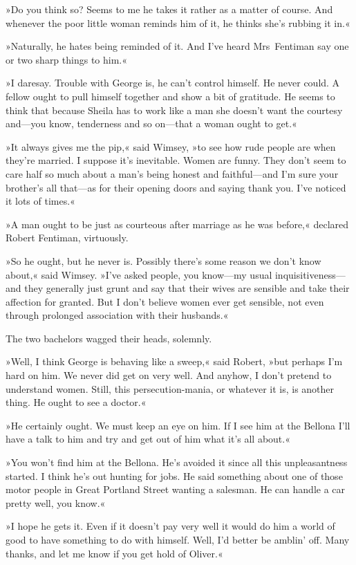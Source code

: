 »Do you think so? Seems to me he takes it rather as a matter of course. And whenever the poor little woman reminds him of it, he thinks she's rubbing it in.«

»Naturally, he hates being reminded of it. And I've heard Mrs~Fentiman say one or two sharp things to him.«

»I daresay. Trouble with George is, he can't control himself. He never could. A fellow ought to pull himself together and show a bit of gratitude. He seems to think that because Sheila has to work like a man she doesn't want the courtesy and—you know, tenderness and so on—that a woman ought to get.«

»It always gives me the pip,« said Wimsey, »to see how rude people are when they're married. I suppose it's inevitable. Women are funny. They don't seem to care half so much about a man's being honest and faithful—and I'm sure your brother's all that—as for their opening doors and saying thank you. I've noticed it lots of times.«

»A man ought to be just as courteous after marriage as he was before,« declared Robert Fentiman, virtuously.

»So he ought, but he never is. Possibly there's some reason we don't know about,« said Wimsey. »I've asked people, you know—my usual inquisitiveness—and they generally just grunt and say that their wives are sensible and take their affection for granted. But I don't believe women ever get sensible, not even through prolonged association with their husbands.«

The two bachelors wagged their heads, solemnly.

»Well, I think George is behaving like a sweep,« said Robert, »but perhaps I'm hard on him. We never did get on very well. And anyhow, I don't pretend to understand women. Still, this persecution-mania, or whatever it is, is another thing. He ought to see a doctor.«

»He certainly ought. We must keep an eye on him. If I see him at the Bellona I'll have a talk to him and try and get out of him what it's all about.«

»You won't find him at the Bellona. He's avoided it since all this unpleasantness started. I think he's out hunting for jobs. He said something about one of those motor people in Great Portland Street wanting a salesman. He can handle a car pretty well, you know.«

»I hope he gets it. Even if it doesn't pay very well it would do him a world of good to have something to do with himself. Well, I'd better be amblin' off. Many thanks, and let me know if you get hold of Oliver.«

